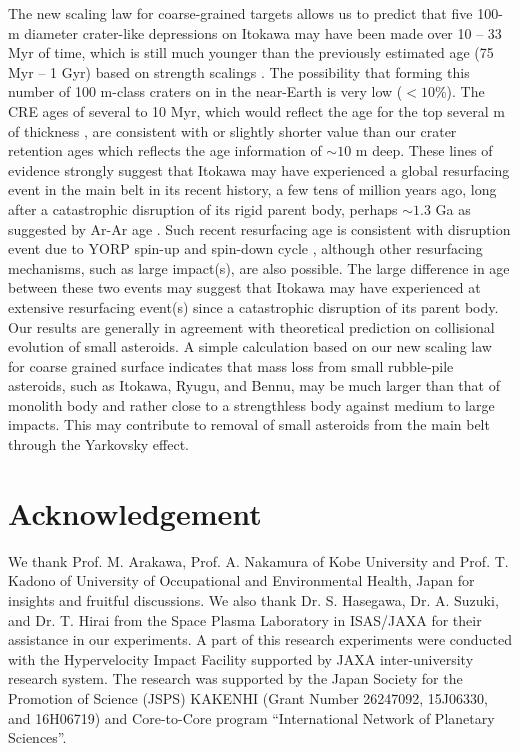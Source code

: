 \documentclass[3p,authoryear]{elsarticle}
\begin{document}
The new scaling law for coarse-grained targets allows us to predict that five 100-m diameter crater-like depressions on Itokawa may have been made over 10 -- 33 Myr of time, which is still much younger than the previously estimated age (75 Myr -- 1 Gyr) based on strength scalings \citep{michel2009}.
The possibility that forming this number of 100 m-class craters on in the near-Earth is very low ($<10$\%).
The CRE ages of several to 10 Myr, which would reflect the age for the top several m of thickness \citep{nagao2011, meier2014, nishiizumi2015}, are consistent with or slightly shorter value than our crater retention ages which reflects the age information of $\sim 10$ m deep.
These lines of evidence strongly suggest that Itokawa may have experienced a global resurfacing event in the main belt in its recent history, a few tens of million years ago, long after a catastrophic disruption of its rigid parent body, perhaps $\sim 1.3$ Ga as suggested by Ar-Ar age \citep{park2015}. Such recent resurfacing age is consistent with disruption event due to YORP spin-up and spin-down cycle \citep{scheeres2008,lowry2014}, although other resurfacing mechanisms, such as large impact(s), are also possible.
The large difference in age between these two events may suggest that Itokawa may have experienced at extensive resurfacing event(s) since a catastrophic disruption of its parent body.
Our results are generally in agreement with theoretical prediction on collisional evolution of small asteroids.
A simple calculation based on our new scaling law for coarse grained surface indicates that mass loss from small rubble-pile asteroids, such as Itokawa, Ryugu, and Bennu, may be much larger than that of monolith body and rather close to a strengthless body against medium to large impacts.
This may contribute to removal of small asteroids from the main belt through the Yarkovsky effect.

\section*{Acknowledgement}
We thank Prof. M. Arakawa, Prof. A. Nakamura of Kobe University and Prof. T. Kadono of University of Occupational and Environmental Health, Japan for insights and fruitful discussions. We also thank Dr. S. Hasegawa, Dr. A. Suzuki, and Dr. T. Hirai from the Space Plasma Laboratory in ISAS/JAXA for their assistance in our experiments. A part of this research experiments were conducted with the Hypervelocity Impact Facility supported by JAXA inter-university research system.
The research was supported by the Japan Society for the Promotion of Science (JSPS) KAKENHI (Grant Number 26247092, 15J06330, and 16H06719) and Core-to-Core program ``International Network of Planetary Sciences''.
\end{document}
